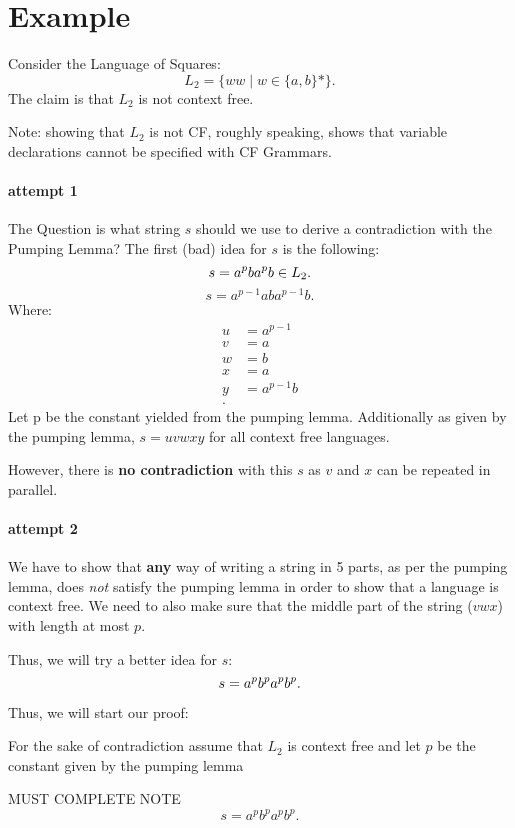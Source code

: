 \documentclass[12pt]{book}
\title{\coursetitle\linebreak\lecturename}
\author{\\Cain Susko\\ 
           \\ \\ \\
      Queen's University 
    \\School of Computing\\}
\begin{document}
\begin{titlepage}
        \maketitle
\end{titlepage}


\section*{Example}
Consider the Language of Squares:
\[
L_2 = \{ww \mid w\in\{a,b\}*\}
.\] 
The claim is that $L_2$ is not context free.

Note: showing that $L_2$ is not CF, roughly speaking, shows that variable declarations
cannot be specified with CF Grammars.
\paragraph{attempt 1}
The Question is what string $s$ should we use to derive a contradiction with the 
Pumping Lemma? The first (bad) idea for $s$ is the following:
 \[
s = a^pba^pb\in L_2\\
.\] 
\[
s = a^{p-1}aba^{p-1}b
.\] 
Where:
\begin{align*}
        u &= a^{p-1} \\
        v &= a \\
        w &= b \\
        x &= a \\
        y &= a^{p-1}b \\
.\end{align*}
Let p be the constant yielded from the pumping lemma.
Additionally as given by the pumping lemma, $s = uvwxy$ for all context 
free languages.

However, there is \textbf{no contradiction} with this $s$ as  $v$ and
$x$ can be repeated in parallel.

\paragraph{attempt 2}
We have to show that \textbf{any} way of writing a string in 5 parts, as per the 
pumping lemma, does \textit{not} satisfy the pumping lemma in order to show 
that a language is context free. We need to also make sure that the middle part
of the string ($vwx$) with length at most $p$.

Thus, we will try a better idea for $s$:
 \[
s = a^pb^pa^pb^p\\
.\] 
\pagebreak

Thus, we will start our proof:

For the sake of contradiction assume that $L_2$ is context free and let $p$ be the 
constant given by the pumping lemma

MUST COMPLETE NOTE
\[
s = a^pb^pa^pb^p
.\] 
\end{document}

